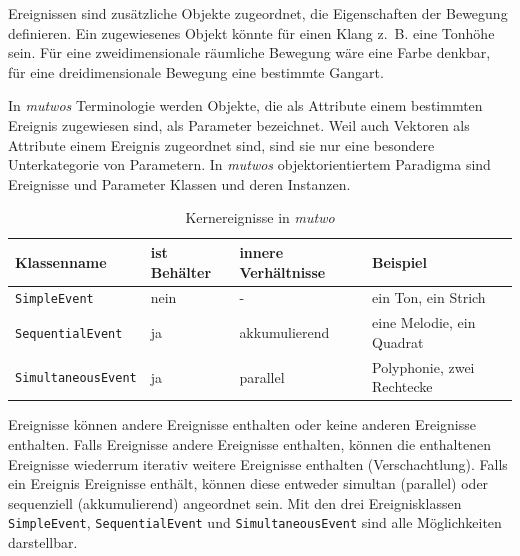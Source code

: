 \documentclass[12pt,a4paper,ngerman]{article}
\begin{document}
\bigskip

Ereignissen sind zusätzliche Objekte zugeordnet, die Eigenschaften der Bewegung definieren.
Ein zugewiesenes Objekt könnte für einen Klang z.~B. eine Tonhöhe sein.
Für eine zweidimensionale räumliche Bewegung wäre eine Farbe denkbar, für eine dreidimensionale Bewegung eine bestimmte Gangart.

\bigskip

In \emph{mutwos} Terminologie werden Objekte, die als Attribute einem bestimmten Ereignis zugewiesen sind, als Parameter bezeichnet.
Weil auch Vektoren als Attribute einem Ereignis zugeordnet sind, sind sie nur eine besondere Unterkategorie von Parametern.
In \emph{mutwos} objektorientiertem Paradigma sind Ereignisse und Parameter Klassen und deren Instanzen.

\bigskip


% 

\begin{table}[h!]
    \begin{center}
        \begin{tabular}{l l l l} 
            \hline
            Klassenname & ist Behälter & innere Verhältnisse & Beispiel \\ [0.5ex] 
            \hline\hline
            \texttt{SimpleEvent} & nein & - & ein Ton, ein Strich \\ 
            \texttt{SequentialEvent} & ja & akkumulierend & eine Melodie, ein Quadrat \\ 
            \texttt{SimultaneousEvent} & ja & parallel & Polyphonie, zwei Rechtecke \\ [1ex] 
            \hline
        \end{tabular}
    \end{center}

    \caption{Kernereignisse in \emph{mutwo}}
\end{table}

Ereignisse können andere Ereignisse enthalten oder keine anderen Ereignisse enthalten.
Falls Ereignisse andere Ereignisse enthalten, können die enthaltenen Ereignisse wiederrum iterativ weitere Ereignisse enthalten (Verschachtlung).
Falls ein Ereignis Ereignisse enthält, können diese entweder simultan (parallel) oder sequenziell (akkumulierend) angeordnet sein.
Mit den drei Ereignisklassen \texttt{SimpleEvent}, \texttt{SequentialEvent} und \texttt{SimultaneousEvent} sind alle Möglichkeiten darstellbar.
\end{document}
